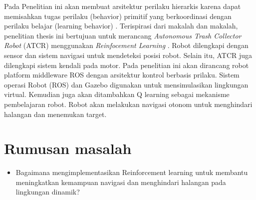 Pada Penelitian ini akan membuat arsitektur perilaku hierarkis karena dapat memisahkan tugas perilaku (behavior) primitif yang berkoordinasi dengan perilaku belajar (learning behavior)  \cite{Hoffmann2003}. Terispirasi dari makalah \cite{Bai2018} dan makalah\cite{Kong2009,Michael2008,Wang2008,Arai2019}, penelitian thesis ini bertujuan untuk merancang \textit{Autonomous Trash Collector Robot} (ATCR) menggunakan \textit{ Reinfocement Learning}  \cite{Mustafa2019}. Robot dilengkapi dengan sensor  dan sistem navigasi untuk mendeteksi posisi robot. Selain itu, ATCR juga dilengkapi sistem kendali pada motor\cite{Saputra2019}. Pada penelitian ini akan dirancang robot platform middleware ROS dengan arsitektur kontrol berbasis prilaku.  Sistem operasi Robot (ROS) dan Gazebo digunakan untuk mensimulasikan lingkungan virtual. Kemudian juga akan ditambahkan Q learning sebagai mekanisme pembelajaran robot. Robot akan melakukan navigasi otonom untuk menghindari halangan dan menemukan target.





\section{Rumusan masalah}
\begin{itemize}

	\item Bagaimana mengimplementasikan Reinforcement learning  untuk membantu meningkatkan kemampuan navigasi dan menghindari halangan pada lingkungan dinamik? 
\end{itemize} 


